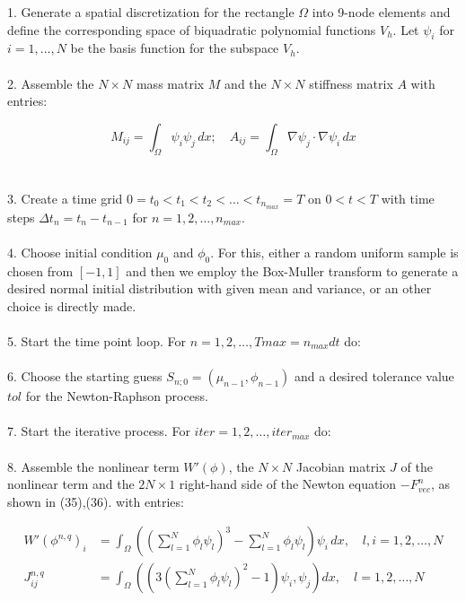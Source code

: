 \documentclass{article}
\begin{document}
1. Generate a spatial discretization for the rectangle $\Omega$ into 9-node elements and define the corresponding space of biquadratic polynomial functions $V_h$. Let $\psi_i$ for $i = 1, \ldots, N$ be the basis function for the subspace $V_h$.\\\\

2. Assemble the $N \times N$ mass matrix $M$ and the $N \times N$ stiffness matrix $A$ with entries:

\[
M_{ij} = \int_{\Omega} \psi_i \psi_j \, dx; \quad A_{ij} = \int_{\Omega} \nabla \psi_j \cdot \nabla \psi_i \, dx
\]\\\\

3. Create a time grid $0 = t_0 < t_1 < t_2 < \ldots < t_{n_{max}} = T$ on $0 < t < T$ with time steps $\Delta t_n = t_n - t_{n-1}$ for $n = 1, 2, \ldots, n_{max}$.\\\\

4. Choose initial condition $\mu_0$ and $\phi_0$. For this, either a random uniform sample is chosen from $[-1,1]$ and then we employ the Box-Muller transform to generate a desired normal initial distribution with given mean and variance, or an other choice is directly made.\\\\

5. Start the time point loop. For $n = 1, 2, \ldots, Tmax=n_{max}dt$ do:\\\\

6. Choose the starting guess $S_{n;0} = (\mu_{n-1}, \phi_{n-1})$ and a desired tolerance value $tol$ for the Newton-Raphson process.\\\\

7. Start the iterative process. For $iter = 1, 2, \ldots, iter_{max}$ do:\\\\

8. Assemble the nonlinear term $W'(\phi)$, the $N \times N$ Jacobian matrix $J$ of the nonlinear term and the $2N \times 1$ right-hand side of the Newton equation $-F^n_{vec}$, as shown in (35),(36). with entries:

\[
\begin{aligned}
W'({\phi}^{n,q})_i &= \int_{\Omega} ((\sum_{l=1}^N\phi_{l}\psi_{l})^3 - \sum_{l=1}^N\phi_{l}\psi_{l}) \psi_i \,dx, \quad l,i = 1, 2, \ldots, N \\
J_{ij}^{n,q} &= \int_{\Omega} ((3(\sum_{l=1}^N\phi_{l}\psi_{l})^2-1)\psi_{i},\psi_{j})dx, \quad l = 1, 2, \ldots, N \\    
\end{aligned}
\] \\\\ 
\end{document}

